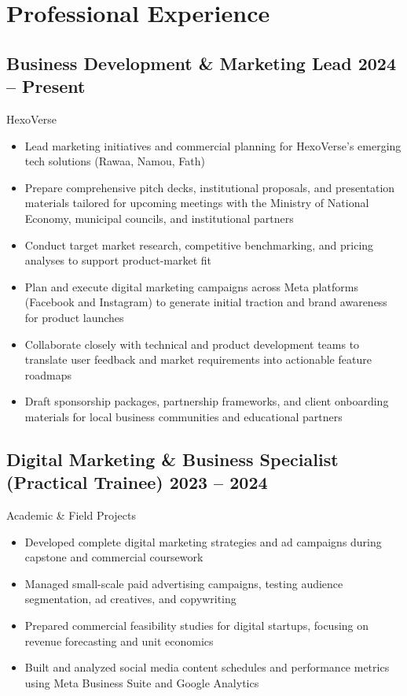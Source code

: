\documentclass[a4paper,11pt]{article}
\newcommand{\cvsection}[2]{%
  \section*{\faIcon{#1}\hspace{8pt}#2}
  \vspace{-5pt}
}
\newcommand{\cvsubsection}[3]{%
  \subsection*{#1 \hfill \normalfont\normalsize\color{secondarycolor}#2}
  \vspace{-3pt}
  {\small\color{secondarycolor}#3}
  \vspace{2pt}
}
\begin{document}
\vspace{8pt}

\cvsection{briefcase}{Professional Experience}
\vspace{10pt}

\cvsubsection{Business Development \& Marketing Lead}{2024 -- Present}{HexoVerse}
\begin{itemize}
    \item Lead marketing initiatives and commercial planning for HexoVerse's emerging tech solutions (Rawaa, Namou, Fath)
    \item Prepare comprehensive pitch decks, institutional proposals, and presentation materials tailored for upcoming meetings with the Ministry of National Economy, municipal councils, and institutional partners
    \item Conduct target market research, competitive benchmarking, and pricing analyses to support product-market fit
    \item Plan and execute digital marketing campaigns across Meta platforms (Facebook and Instagram) to generate initial traction and brand awareness for product launches
    \item Collaborate closely with technical and product development teams to translate user feedback and market requirements into actionable feature roadmaps
    \item Draft sponsorship packages, partnership frameworks, and client onboarding materials for local business communities and educational partners
\end{itemize}

\cvsubsection{Digital Marketing \& Business Specialist (Practical Trainee)}{2023 -- 2024}{Academic \& Field Projects}
\begin{itemize}
    \item Developed complete digital marketing strategies and ad campaigns during capstone and commercial coursework
    \item Managed small-scale paid advertising campaigns, testing audience segmentation, ad creatives, and copywriting
    \item Prepared commercial feasibility studies for digital startups, focusing on revenue forecasting and unit economics
    \item Built and analyzed social media content schedules and performance metrics using Meta Business Suite and Google Analytics
\end{itemize}
\end{document}
